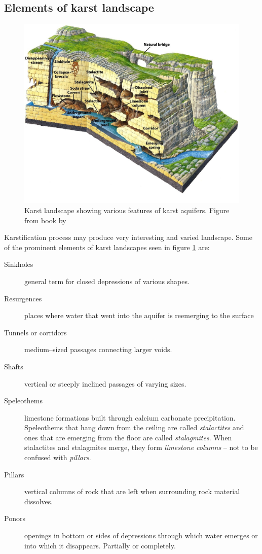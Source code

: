 \subsection{Elements of karst landscape}

\begin{figure}
  \centerline{\includegraphics[width=\textwidth]{chapters/karstification/karst_landscape.jpg}}
  \caption{Karst landscape showing various features of karst aquifers.
    Figure from book by \cite{marshak2006}}
  \label{fig:karstlandscape}
\end{figure}


Karstification process may produce very interesting and varied landscape. Some
of the prominent elements of karst landscapes seen in figure \ref{fig:karstlandscape}
are:

\begin{description}
  \item[Sinkholes]
    general term for closed depressions of various shapes.
  \item[Resurgences]
    places where water that went into the aquifer is reemerging to the surface
  \item[Tunnels or corridors] medium--sized passages connecting larger voids.
  \item[Shafts] vertical or steeply inclined passages of varying sizes.
  \item[Speleothems] limestone formations built through calcium carbonate
    precipitation. Speleothems that hang down from the ceiling are called
    \emph{stalactites} and ones that are emerging from the floor are called
    \emph{stalagmites}. When stalactites and stalagmites merge, they form
    \emph{limestone columns} -- not to be confused with \emph{pillars}.
  \item[Pillars] vertical columns of rock that are left when surrounding rock
    material dissolves.
  \item[Ponors] openings in bottom or sides of depressions through which water
    emerges or into which it disappears. Partially or completely.
\end{description}

